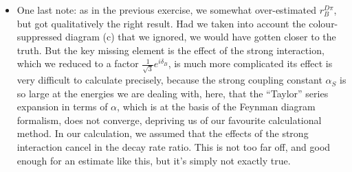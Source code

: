 \begin{enumerate}[a)]
{\begin{itemize}
    step further and estimate some numerical values. We don't
    know $\delta_B^{D\pi}$ or $\delta_D^{K\pi}$, but we know that 
    $|\sin(...)| \le 1$. Using this, the values for $r_B^{D\pi}$ and
    $r_D^{K\pi}$ we estimated, and $\gamma = 68^{\circ}$ we can
    estimate upper limits on the asymmetries:
    \begin{eqnarray*}
      A_{CP}^{\Kp\pim} & \le & \left|
        \frac{
          2\,\frac{r_B^{D\pi}}{r_D^{K\pi}} \sin\gamma
        }{
          1 + \left(\frac{r_B^{D\pi}}{r_D^{K\pi}}\right)^2 
        }\right|  = 0.42 \\
      A_{CP}^{\Km\pip} & \le & \left|
      \frac{
         2\, r_B^{D\pi} r_D^{K\pi}\,\sin\gamma
      }{
        1 + \left(r_B^{D\pi} r_D^{K\pi}\right)^2 
      }\right| = 0.0011
      \\
      A_{CP}^{KK} = A_{CP}^{\pi\pi} & \le &
      \left|\frac{
        2\, r_B^{D\pi} \,\sin\gamma
      }{
        1 + \left(r_B^{D\pi}\right)^2 
      }\right| = 0.022
    \end{eqnarray*}
    So we see that using a decay mode where the suppressed  decay amplitude is matched by a favoured \Do\
    decay amplitude and vice versa maximises the asymmetry. Using the
    opposite theme, where the suppressed \Do\ decay amplitude and the
    suppressed \Bpm\ decay amplitude in the same decay path minimises
    the asymmetry. And using a \Do\ decay to a CP eigenstate like
    \prt{\Km\Kp}, where both decay amplitudes (\prt{\Do \to \Kp\Km}
    and \prt{\Do \to \Km \Kp}) are the same gives a result somewhere
    in the middle.
  \item One last note: as in the previous exercise, we somewhat
    over-estimated $r_B^{D\pi}$, but got qualitatively the right
    result. Had we taken into account the colour-suppressed diagram
    (c) that we ignored, we would have gotten closer to the truth. But
    the key missing element is the effect of the strong interaction,
    which we reduced to a factor $\frac{1}{\sqrt{3}} e^{i\delta_B}$,
    is much more complicated its effect is very difficult to calculate
    precisely, because the strong coupling constant $\alpha_S$ is so
    large at the energies we are dealing with, here, that the
    ``Taylor'' series expansion in terms of $\alpha$, which is at the
    basis of the Feynman diagram formalism, does not converge,
    depriving us of our favourite calculational method. In our
    calculation, we assumed that the effects of the strong interaction
    cancel in the decay rate ratio. This is not too far off, and good
    enough for an estimate like this, but it's simply not exactly true.
  \end{itemize}
}
\end{enumerate}
